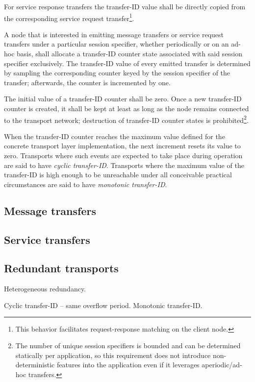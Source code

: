 For service response transfers the transfer-ID value shall be directly copied from the corresponding
service request transfer\footnote{This behavior facilitates request-response matching on the client node.}.

A node that is interested in emitting message transfers or service request transfers
under a particular session specifier, whether periodically or on an ad-hoc basis,
shall allocate a transfer-ID counter state associated with said session specifier exclusively.
The transfer-ID value of every emitted transfer is determined by sampling the corresponding counter
keyed by the session specifier of the transfer; afterwards, the counter is incremented by one.

The initial value of a transfer-ID counter shall be zero.
Once a new transfer-ID counter is created,
it shall be kept at least as long as the node remains connected to the transport network;
destruction of transfer-ID counter states is prohibited\footnote{%
    The number of unique session specifiers is bounded and can be determined statically per application,
    so this requirement does not introduce non-deterministic features into the application even if it leverages
    aperiodic/ad-hoc transfers.
}.

When the transfer-ID counter reaches the maximum value defined for the concrete transport layer implementation,
the next increment resets its value to zero.
Transports where such events are expected to take place during operation are said to have \emph{cyclic transfer-ID}.
Transports where the maximum value of the transfer-ID is high enough to be unreachable under all conceivable
practical circumstances are said to have \emph{monotonic transfer-ID}.

\subsection{Message transfers}


\subsection{Service transfers}


\subsection{Redundant transports}

Heterogeneous redundancy.

Cyclic transfer-ID -- same overflow period. Monotonic transfer-ID.
